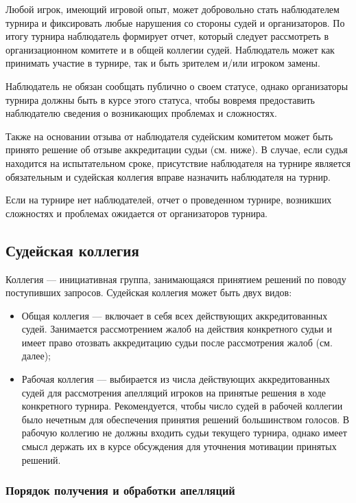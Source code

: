 Любой игрок, имеющий игровой опыт, может добровольно стать наблюдателем турнира и фиксировать любые нарушения со стороны судей и организаторов. По итогу турнира наблюдатель формирует отчет, который следует рассмотреть в организационном комитете и в общей коллегии судей. Наблюдатель может как принимать участие в турнире, так и быть зрителем и/или игроком замены.

Наблюдатель не обязан сообщать публично о своем статусе, однако организаторы турнира должны быть в курсе этого статуса, чтобы вовремя предоставить наблюдателю сведения о возникающих проблемах и сложностях.

Также на основании отзыва от наблюдателя судейским комитетом может быть принято решение об отзыве аккредитации судьи (см. ниже). В случае, если судья находится на испытательном сроке, присутствие наблюдателя на турнире является обязательным и судейская коллегия вправе назначить наблюдателя на турнир.

Если на турнире нет наблюдателей, отчет о проведенном турнире, возникших сложностях и проблемах ожидается от организаторов турнира.

\subsection{Судейская коллегия}

Коллегия --- инициативная группа, занимающаяся принятием решений по поводу поступивших запросов. Судейская коллегия может быть двух видов:

\begin{itemize}
	\item Общая коллегия --- включает в себя всех действующих аккредитованных судей. Занимается рассмотрением жалоб на действия конкретного судьи и имеет право отозвать аккредитацию судьи после рассмотрения жалоб (см. далее);
	\item Рабочая коллегия --- выбирается из числа действующих аккредитованных судей для рассмотрения апелляций игроков на принятые решения в ходе конкретного турнира. Рекомендуется, чтобы число судей в рабочей коллегии было нечетным для обеспечения принятия решений большинством голосов. В рабочую коллегию не должны входить судьи текущего турнира, однако имеет смысл держать их в курсе обсуждения для уточнения мотивации принятых решений.
\end{itemize}

\subsubsection{Порядок получения и обработки апелляций}

